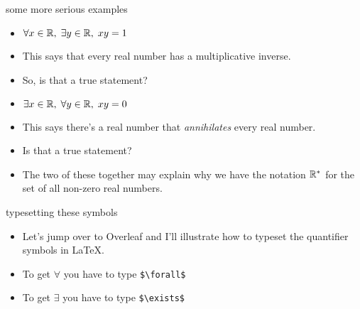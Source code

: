 \documentclass[landscape]{beamer}
\begin{document}
\begin{frame}{some more serious examples}
\begin{itemize}
\item \rule{0pt}{24pt} $\displaystyle \forall x \in {\mathbb R}, \; \exists y \in {\mathbb R}, \; xy = 1 $ \pause
\item This says that every real number has a multiplicative inverse. \pause
\item So, is that a true statement? \pause
\item \rule{0pt}{24pt} $\displaystyle \exists x \in {\mathbb R}, \; \forall y \in {\mathbb R}, \; xy = 0 $ \pause
\item This says there's a real number that {\em annihilates} every real number. \pause
\item Is that a true statement? \pause
\item The two of these together may explain why we have the notation ${\mathbb R}^\ast$ for the set of all non-zero real numbers.
\end{itemize}
\end{frame}

\begin{frame}{typesetting these symbols}
\begin{itemize}
\item Let's jump over to Overleaf and I'll illustrate how to typeset the quantifier symbols in \LaTeX. \pause
\item To get $\forall$ you have to type {\tt \$\textbackslash forall\$} \pause
\item To get $\exists$ you have to type {\tt \$\textbackslash exists\$}
\end{itemize}
\end{frame}
\end{document}
